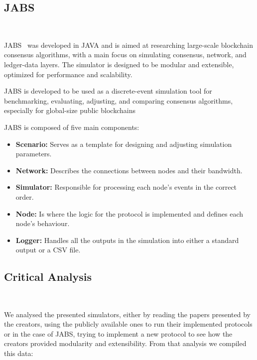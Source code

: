 \subsection{JABS}~\label{subsec:jabs}

JABS~\cite{jabs} was developed in JAVA and is aimed at researching large-scale blockchain consensus algorithms, with a main focus
on simulating consensus, network, and ledger-data layers. The simulator is designed to be
modular and extensible, optimized for performance and scalability.

JABS is developed to be used as a discrete-event simulation tool for benchmarking, evaluating, adjusting,
and comparing consensus algorithms, especially for global-size public blockchains

JABS is composed of five main components:

\begin{itemize}
  \item \textbf{Scenario:} Serves as a template for designing and adjusting simulation parameters.
  \item \textbf{Network:} Describes the connections between nodes and their bandwidth.
  \item \textbf{Simulator:} Responsible for processing each node's events in the correct order.
  \item \textbf{Node:} Is where the logic for the protocol is implemented and defines each node's
  behaviour.
  \item \textbf{Logger:} Handles all the outputs in the simulation into either a standard output or
  a CSV file.
\end{itemize}


\subsection{Critical Analysis}~\label{subsec:critical_analysis}

We analysed the presented simulators, either by reading the papers presented by the creators,
using the publicly available ones to run their implemented protocols or in the case of JABS, trying to
implement a new protocol to see how the creators provided modularity and extensibility. From that
analysis we compiled this data:

